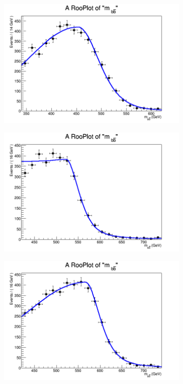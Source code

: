 \begin{figure}[phtb!]
\begin{center}
  \begin{subfigure}[$m_{A}=500$ GeV]{0.4\textwidth}\includegraphics[width=\textwidth]{FitResults/images/fitMC_bAbb500_2.png}\end{subfigure}
  \begin{subfigure}[$m_{A}=550$ GeV]{0.4\textwidth}\includegraphics[width=\textwidth]{FitResults/images/fitMC_bAbb550_2.png}\end{subfigure}
  \begin{subfigure}[$m_{A}=600$ GeV]{0.4\textwidth}\includegraphics[width=\textwidth]{FitResults/images/fitMC_bAbb600_2.png}\end{subfigure}

\end{center}
\end{figure}
